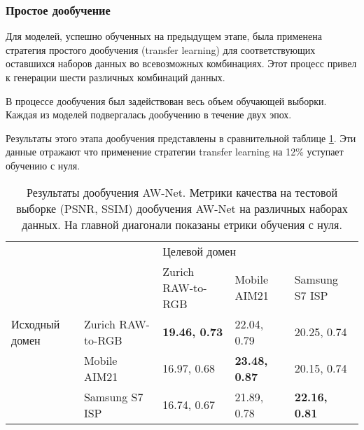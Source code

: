 \subsubsection{Простое дообучение}

Для моделей, успешно обученных на предыдущем этапе, была применена стратегия простого дообучения (transfer learning) для соответствующих оставшихся наборов данных во всевозможных комбинациях. Этот процесс привел к генерации шести различных комбинаций данных.

В процессе дообучения был задействован весь объем обучающей выборки. Каждая из моделей подвергалась дообучению в течение двух эпох.

Результаты этого этапа дообучения представлены в сравнительной таблице \ref{tab:tl}. Эти данные отражают что применение стратегии transfer learning на 12\% уступает обучению с нуля.

\begin{table}[H]
    \caption{Результаты дообучения AW-Net. Метрики качества на тестовой выборке (PSNR, SSIM) дообучения AW-Net на различных наборах данных. На главной диагонали показаны етрики обучения с нуля.}\label{tab:tl}
    \begin{tabular}{|p{3cm}p{3cm}|p{3cm}p{3cm}p{3cm}|}
        \hline
        \multicolumn{2}{|p{3cm}|}{\multirow{2}{*}{}}                     & \multicolumn{3}{p{5cm}|}{Целевой домен}                                                                                \\ \cline{3-5} 
        \multicolumn{2}{|p{3cm}|}{}                                      & \multicolumn{1}{p{3cm}|}{Zurich RAW-to-RGB}    & \multicolumn{1}{p{3cm}|}{Mobile AIM21}         & Samsung S7 ISP       \\ \hline
        \multicolumn{1}{|p{3cm}|}{Исходный домен}    & Zurich RAW-to-RGB & \multicolumn{1}{p{3cm}|}{\textbf{19.46, 0.73}} & \multicolumn{1}{p{3cm}|}{22.04, 0.79}          & 20.25, 0.74          \\ \cline{2-5} 
        \multicolumn{1}{|p{3cm}|}{}                  & Mobile AIM21      & \multicolumn{1}{p{3cm}|}{16.97, 0.68}          & \multicolumn{1}{p{3cm}|}{\textbf{23.48, 0.87}} & 20.15, 0.74          \\ \cline{2-5} 
        \multicolumn{1}{|p{3cm}|}{}                  & Samsung S7 ISP    & \multicolumn{1}{p{3cm}|}{16.74, 0.67}          & \multicolumn{1}{p{3cm}|}{21.89, 0.78}          & \textbf{22.16, 0.81} \\ \hline
    \end{tabular}
\end{table}

